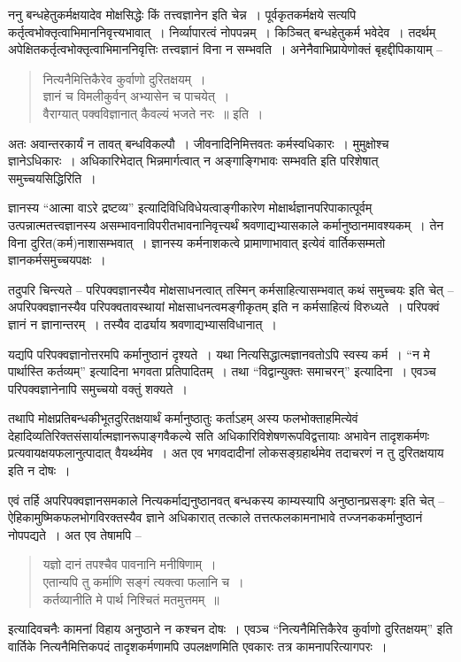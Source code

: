 {ननु बन्धहेतुकर्मक्षयादेव मोक्षसिद्धेः किं तत्त्वज्ञानेन इति चेन्न~। पूर्वकृतकर्मक्षये सत्यपि कर्तृत्वभोक्तृत्वाभिमाननिवृत्त्यभावात्~। निर्व्यापारत्वं नोपपन्नम्~। किञ्चित् बन्धहेतुकर्म भवेदेव~। तदर्थम् अपेक्षितकर्तृत्वभोक्तृत्वाभिमाननिवृत्तिः तत्त्वज्ञानं विना न सम्भवति~। अनेनैवाभिप्रायेणोक्तं बृहद्दीपिकायाम् –
\begin{verse}
नित्यनैमित्तिकैरेव कुर्वाणो दुरितक्षयम्~। \\
ज्ञानं च विमलीकुर्वन् अभ्यासेन च पाचयेत्~। \\
वैराग्यात् पक्वविज्ञानात् कैवल्यं भजते नरः~॥ इति~। 
\end{verse}
अतः अवान्तरकार्यं न तावत् बन्धविकल्पौ~। जीवनादिनिमित्तवतः कर्मस्वधिकारः~। मुमुक्षोश्च ज्ञानेऽधिकारः~। अधिकारिभेदात् भिन्नमार्गत्वात् न अङ्गाङ्गिभावः सम्भवति इति परिशेषात् समुच्चयसिद्धिरिति~। 

ज्ञानस्य “आत्मा वाऽरे द्रष्टव्य” इत्यादिविधिविधेयत्वाङ्गीकारेण मोक्षार्थज्ञानपरिपा\-कात्पूर्वम् उत्पन्नात्मतत्त्वज्ञानस्य असम्भावनाविपरीतभावनानिवृत्त्यर्थं श्रवणाद्यभ्यासकाले कर्मानुष्ठानमावश्यकम्~। तेन विना दुरित(कर्म)नाशासम्भवात्~। ज्ञानस्य कर्मनाशकत्वे प्रामाणाभावात् इत्येवं वार्तिकसम्मतो ज्ञानकर्मसमुच्चयपक्षः~। 

तदुपरि चिन्त्यते – परिपक्वज्ञानस्यैव मोक्षसाधनत्वात् तस्मिन् कर्मसाहित्यासम्भवात् कथं समुच्चयः इति चेत् – अपरिपक्वज्ञानस्यैव परिपक्वतावस्थायां मोक्षसाधनत्वमङ्गीकृतम् इति न कर्मसाहित्यं विरुध्यते~। परिपक्वं ज्ञानं न ज्ञानान्तरम्~। तस्यैव दार्ढ्याय श्रवणाद्यभ्यासविधानात्~। 

यद्यपि परिपक्वज्ञानोत्तरमपि कर्मानुष्ठानं दृश्यते~। यथा नित्यसिद्धात्मज्ञानवतोऽपि स्वस्य कर्म~। “न मे पार्थास्ति कर्तव्यम्” इत्यादिना भगवता प्रतिपादितम्~। तथा “विद्वान्युक्तः समाचरन्” इत्यादिना~। एवञ्च परिपक्वज्ञानेनापि समुच्चयो वक्तुं शक्यते~। 

तथापि मोक्षप्रतिबन्धकीभूतदुरितक्षयार्थं कर्मानुष्ठातुः कर्ताऽहम् अस्य फलभोक्ताहमित्येवं देहादिव्यतिरिक्तसंसार्यात्मज्ञानरूपाङ्गवैकल्ये सति अधिकारिविशेषणरूपविद्वत्तायाः अभावेन तादृशकर्मणः प्रत्यवायक्षयफलानुत्पादात् वैयर्थ्यमेव~। अत एव भगवदादीनां लोकसङ्ग्रहार्थमेव तदाचरणं न तु दुरितक्षयाय इति न दोषः~। 

एवं तर्हि अपरिपक्वज्ञानसमकाले नित्यकर्माद्यनुष्ठानवत् बन्धकस्य काम्यस्यापि अनुष्ठान\-प्रसङ्गः इति चेत् – ऐहिकामुष्मिकफलभोगविरक्तस्यैव ज्ञाने अधिकारात् तत्काले तत्तत्फलकामनाभावे तज्जनककर्मानुष्ठानं नोपपद्यते~। अत एव तेषामपि –
\begin{verse}
यज्ञो दानं तपश्चैव पावनानि मनीषिणाम्~। \\
एतान्यपि तु कर्माणि सङ्गं त्यक्त्वा फलानि च~। \\
कर्तव्यानीति मे पार्थ निश्चितं मतमुत्तमम्~॥
\end{verse}
इत्यादिवचनैः कामनां विहाय अनुष्ठाने न कश्चन दोषः~। एवञ्च “नित्यनैमित्तिकैरेव कुर्वाणो दुरितक्षयम्” इति वार्तिके नित्यनैमित्तिकपदं तादृशकर्मणामपि उपलक्षणमिति एवकारः तत्र कामनापरित्यागपरः~। 

}

